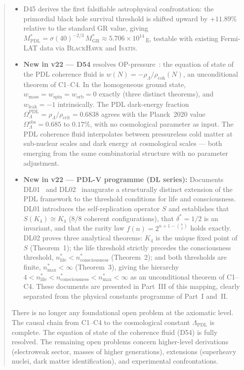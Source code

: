 \documentclass[11pt,a4paper]{article}
\theoremstyle{plain}
\theoremstyle{definition}
\theoremstyle{remark}
\newcommand{\rhocoh}{\rho_{\mathrm{coh}}}
\begin{document}
\begin{abstract}
\begin{itemize}
\item D45 derives the first falsifiable astrophysical confrontation: the primordial black hole survival threshold is shifted upward by $+11.89\%$ relative to the standard GR value, giving $M^*_{\mathrm{PDL}} = \sigma(40)^{-2/3}\,M^*_{\mathrm{GR}} \approx 5.706 \times 10^{14}$\,g, testable with existing Fermi-LAT data via \textsc{BlackHawk} and \textsc{Isatis}.
\item \textbf{New in v22 --- D54} resolves OP-pressure~\cite{D54}: the equation of state of the PDL coherence fluid is $w(N) = -\rho_\Lambda/\rhocoh(N)$, an unconditional theorem of C1--C4. In the homogeneous ground state, $w_{\mathrm{mass}} = w_{\mathrm{spin}} = w_{\mathrm{orb}} = 0$ exactly (three distinct theorems), and $w_{\mathrm{leak}} = -1$ intrinsically. The PDL dark-energy fraction $\Omega_\Lambda^{\mathrm{PDL}} = \rho_\Lambda/\rho_{\mathrm{crit}} = 0.6838$ agrees with the Planck~2020 value $\Omega_\Lambda^{\mathrm{obs}} = 0.685$ to $0.17\%$, with no cosmological parameter as input. The PDL coherence fluid interpolates between pressureless cold matter at sub-nuclear scales and dark energy at cosmological scales --- both emerging from the same combinatorial structure with no parameter adjustment.
\item \textbf{New in v22 --- PDL-V programme (DL series):} Documents DL01~\cite{DL01} and DL02~\cite{DL02} inaugurate a structurally distinct extension of the PDL framework to the threshold conditions for life and consciousness. DL01 introduces the self-replication operator $S$ and establishes that $S(K_4) \cong K_4$ (8/8 coherent configurations), that $\delta^* = 1/2$ is an invariant, and that the rarity law $f(n) = 2^{n+1-\binom{n}{2}}$ holds exactly. DL02 proves three analytical theorems: $K_4$ is the unique fixed point of $S$ (Theorem~1); the life threshold strictly precedes the consciousness threshold, $n^*_{\mathrm{life}} < n^*_{\mathrm{consciousness}}$ (Theorem~2); and both thresholds are finite, $n^*_{\mathrm{max}} < \infty$ (Theorem~3), giving the hierarchy $4 < n^*_{\mathrm{life}} < n^*_{\mathrm{consciousness}} < n^*_{\mathrm{max}} < \infty$ as an unconditional theorem of C1--C4. These documents are presented in Part~III of this mapping, clearly separated from the physical constants programme of Part~I and~II.
\end{itemize}
There is no longer any foundational open problem at the axiomatic level. The causal chain from C1--C4 to the cosmological constant $\Lambda_{\mathrm{PDL}}$ is complete. The equation of state of the coherence fluid (D54) is fully resolved. The remaining open problems concern higher-level derivations (electroweak sector, masses of higher generations), extensions (superheavy nuclei, dark matter identification), and experimental confrontations.
\end{abstract}
\end{document}
